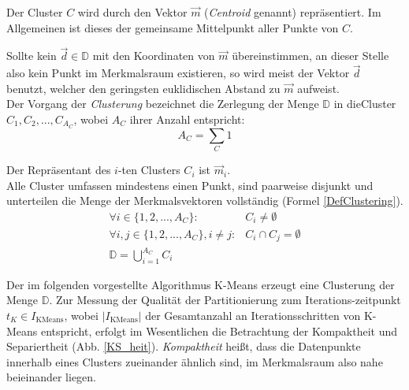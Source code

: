  \noindent Der Cluster $C$ wird durch den Vektor $\vec{m}$ (\textit{Centroid} genannt) repräsentiert. Im Allgemeinen ist dieses der gemeinsame Mittelpunkt aller Punkte von $C$. \cite{Jaehne2002}
  
  Sollte kein $\vec{d}\in\mathbb{D}$ mit den Koordinaten von $\vec{m}$ übereinstimmen, an dieser Stelle also kein Punkt im Merkmalsraum existieren, so wird meist der Vektor $\vec{d}$ benutzt, welcher den geringsten euklidischen Abstand zu $\vec{m}$ aufweist. \cite{Omran2005}\\

  \noindent Der Vorgang der \textit{Clusterung} bezeichnet die Zerlegung der Menge $\mathbb{D}$ in die\linebreak Cluster $C_1, C_2, ..., C_{A_C}$, wobei $A_C$ ihrer Anzahl entspricht:
  \begin{equation}
    A_C = \sum\limits_{C} 1
  \end{equation}
  
  \noindent Der Repräsentant des $i$-ten Clusters $C_i$ ist $\vec{m}_i$.\\

  \noindent Alle Cluster umfassen mindestens einen Punkt, sind paarweise disjunkt und unterteilen die Menge der Merkmalsvektoren vollständig (Formel \ref{DefClustering}). \cite{Omran2005d}
  \begin{equation}\label{DefClustering}
    \begin{array}{ll}
      \forall i\in\{1, 2, ..., A_C\}: & C_i \neq\emptyset\\
      \forall i,j\in\{1, 2, ..., A_C\},i \neq j: & C_i\cap C_j = \emptyset\\
      \mathbb{D} = \bigcup\limits_{i=1}^{A_C} C_i 
    \end{array}
  \end{equation}

  \noindent Der im folgenden vorgestellte Algorithmus K-Means erzeugt eine Clusterung der Menge $\mathbb{D}$. Zur Messung der Qualität der Partitionierung zum Iterations-\linebreak zeitpunkt $t_K\in I_\textrm{KMeans}$, wobei $|I_\textrm{KMeans}|$ der Gesamtanzahl an Iterationsschritten von K-Means entspricht, erfolgt im Wesentlichen die Betrachtung der Kompaktheit und Separiertheit (Abb. \ref{KS_heit}). \textit{Kompaktheit} heißt, dass die Datenpunkte innerhalb eines Clusters zueinander ähnlich sind, im Merkmalsraum also nahe beieinander liegen.
  

